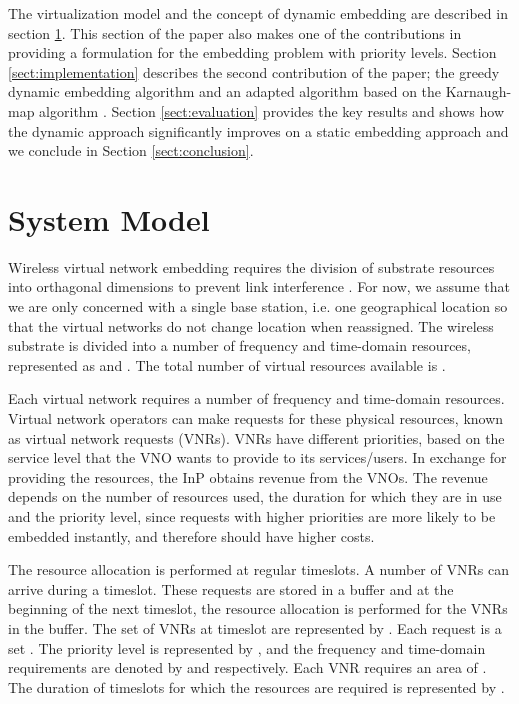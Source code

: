 \documentclass[conference]{IEEEtran}
\begin{document}
The virtualization model and the concept of dynamic embedding are described in section \ref{sect:model}. This section of the paper also makes one of the contributions in providing a formulation for the embedding problem with priority levels. Section \ref{sect:implementation} describes the second contribution of the paper; the greedy dynamic embedding algorithm and an adapted algorithm based on the Karnaugh-map algorithm \cite{Yang2012}. Section \ref{sect:evaluation} provides the key results and shows how the dynamic approach significantly improves on a static embedding approach and we conclude in Section \ref{sect:conclusion}.



\section{System Model}
\label{sect:model}



Wireless virtual network embedding requires the division of substrate resources into orthagonal dimensions to prevent link interference \cite{Park2009}. For now, we assume that we are only concerned with a single base station, i.e. one geographical location so that the virtual networks do not change location when reassigned. The wireless substrate is divided into a number of frequency and time-domain resources, represented as  and . The total number of virtual resources available is .

Each virtual network requires a number of frequency and time-domain resources. Virtual network operators can make requests for these physical resources, known as virtual network requests (VNRs). VNRs have different priorities, based on the service level that the VNO wants to provide to its services/users. In exchange for providing the resources, the InP obtains revenue from the VNOs. The revenue depends on the number of resources used, the duration for which they are in use and the priority level, since requests with higher priorities are more likely to be embedded instantly, and therefore should have higher costs.

The resource allocation is performed at regular timeslots. A number of VNRs can arrive during a timeslot. These requests are stored in a buffer and at the beginning of the next timeslot, the resource allocation is performed for the VNRs in the buffer. The set of VNRs at timeslot  are represented by . Each request is a set . The priority level is represented by , and the frequency and time-domain requirements are denoted by  and  respectively. Each VNR requires an area  of . The duration of timeslots for which the resources are required is represented by .
\end{document}
